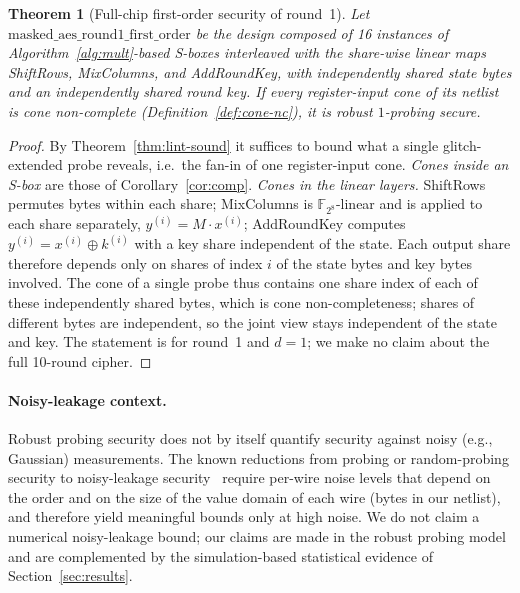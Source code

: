 \documentclass[lettersize,journal]{IEEEtran}
\newtheorem{theorem}{Theorem}
\newcommand{\share}[2]{#1^{(#2)}}
\begin{document}
\begin{theorem}[Full-chip first-order security of round~1]
\label{thm:fullchip}
Let $\mathrm{masked\_aes\_round1\_first\_order}$ be the design composed of 16
instances of Algorithm~\ref{alg:mult}-based S-boxes interleaved with the
share-wise linear maps ShiftRows, MixColumns, and AddRoundKey, with
independently shared state bytes and an independently shared round key. If
every register-input cone of its netlist is cone non-complete
(Definition~\ref{def:cone-nc}), it is robust $1$-probing secure.
\end{theorem}
\begin{proof}
By Theorem~\ref{thm:lint-sound} it suffices to bound what a single
glitch-extended probe reveals, i.e.\ the fan-in of one register-input cone.
\emph{Cones inside an S-box} are those of Corollary~\ref{cor:comp}.
\emph{Cones in the linear layers.} ShiftRows permutes bytes within each share;
MixColumns is $\mathbb{F}_{2^8}$-linear and is applied to each share
separately, $\share{y}{i}=M\cdot\share{x}{i}$; AddRoundKey computes
$\share{y}{i}=\share{x}{i}\oplus\share{k}{i}$ with a key share independent of
the state. Each output share therefore depends only on shares of index $i$
of the state bytes and key bytes involved. The cone of a single probe thus
contains one share index of each of these independently shared bytes, which
is cone non-completeness; shares of different bytes are independent, so the
joint view stays independent of the state and key. The statement is for
round~1 and $d{=}1$; we make no claim about the full 10-round cipher.
\end{proof}

\paragraph{Noisy-leakage context.}
Robust probing security does not by itself quantify security against noisy
(e.g., Gaussian) measurements. The known reductions from probing or
random-probing security to noisy-leakage security~\cite{duc2014unifying}
require per-wire noise levels that depend on the order and on the size of the
value domain of each wire (bytes in our netlist), and therefore yield
meaningful bounds only at high noise. We do not claim a numerical
noisy-leakage bound; our claims are made in the robust probing model and are
complemented by the simulation-based statistical evidence of
Section~\ref{sec:results}.
\end{document}
